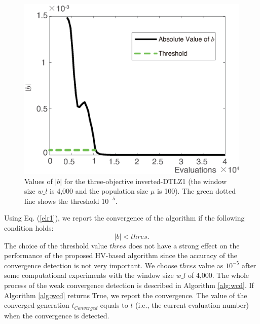\documentclass[conference]{IEEEtran}
\begin{document}
\begin{figure}[!t]
  \centering
    \includegraphics[width=\columnwidth]{FVEMOA_IDTLZ1_M3_nadir_2}
  \caption{Values of $\lvert b\rvert$ for the three-objective inverted-DTLZ1
  (the window size $w\_l$ is 4,000 and the population size $\mu$ is 100).
  The green dotted line shows the threshold $10^{-5}$. 
  }
  \label{wcd2}
\end{figure}

Using Eq. (\ref{elr1}), we report the convergence of the algorithm if the following
condition holds:
\begin{equation}\label{elr2}
  \lvert b \rvert < thres. 
\end{equation}
The choice of the threshold value $thres$ does not have a strong effect on the performance 
of the proposed HV-based algorithm since the accuracy of the convergence detection is not very important.
We choose $thres$ value as $10^{-5}$ after some computational experiments with 
the window size $w\_ l$ of 4,000. 
The whole process of the weak convergence detection is described in Algorithm \ref{alg:wcd}. 
If Algorithm \ref{alg:wcd} returns True, we report the convergence. 
The value of the converged generation $t_{Converged}$ equals to $t$ (i.e., the current evaluation number) 
when the convergence is detected. 
\end{document}
